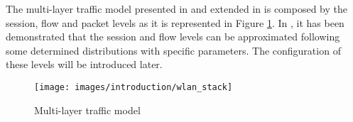 The multi-layer traffic model presented in \cite{Campus-WLAN} and extended in \cite{marcello} is composed by the session, flow and packet levels as it is represented in Figure \ref{fig:layers}. In \cite{Campus-WLAN}, it has been demonstrated that the session and flow levels can be approximated following some determined distributions with specific parameters. The configuration of these levels will be introduced later.

\begin{figure}[h]
	\centering
	\texttt{[image: images/introduction/wlan\_stack]}
	\caption{Multi-layer traffic model \cite{Campus-WLAN}}
	\label{fig:layers}
\end{figure}